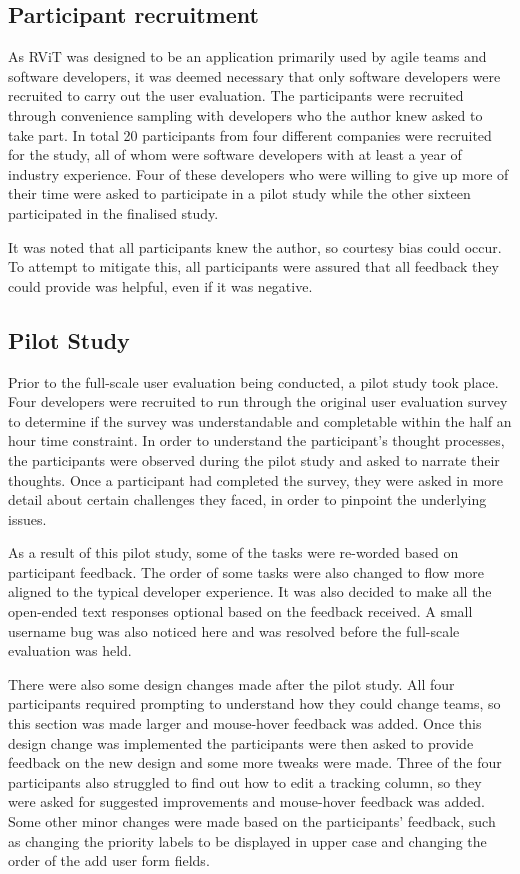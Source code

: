 \documentclass[l4proj.tex]{subfiles}
\begin{document}
\subsection{Participant recruitment}
As RViT was designed to be an application primarily used by agile teams and software developers, it was deemed necessary that only software developers were recruited to carry out the user evaluation. The participants were recruited through convenience sampling with developers who the author knew asked to take part. In total 20 participants from four different companies were recruited for the study, all of whom were software developers with at least a year of industry experience. Four of these developers who were willing to give up more of their time were asked to participate in a pilot study while the other sixteen participated in the finalised study.

It was noted that all participants knew the author, so courtesy bias could occur. To attempt to mitigate this, all participants were assured that all feedback they could provide was helpful, even if it was negative.


\subsection{Pilot Study}
Prior to the full-scale user evaluation being conducted, a pilot study took place. Four developers were recruited to run through the original user evaluation survey to determine if the survey was understandable and completable within the half an hour time constraint. In order to understand the participant's thought processes, the participants were observed during the pilot study and asked to narrate their thoughts. Once a participant had completed the survey, they were asked in more detail about certain challenges they faced, in order to pinpoint the underlying issues. 

As a result of this pilot study, some of the tasks were re-worded based on participant feedback. The order of some tasks were also changed to flow more aligned to the typical developer experience. It was also decided to make all the open-ended text responses optional based on the feedback received. A small username bug was also noticed here and was resolved before the full-scale evaluation was held.

There were also some design changes made after the pilot study. All four participants required prompting to understand how they could change teams, so this section was made larger and mouse-hover feedback was added. Once this design change was implemented the participants were then asked to provide feedback on the new design and some more tweaks were made. Three of the four participants also struggled to find out how to edit a tracking column, so they were asked for suggested improvements and mouse-hover feedback was added. Some other minor changes were made based on the participants' feedback, such as changing the priority labels to be displayed in upper case and changing the order of the add user form fields.
\end{document}
